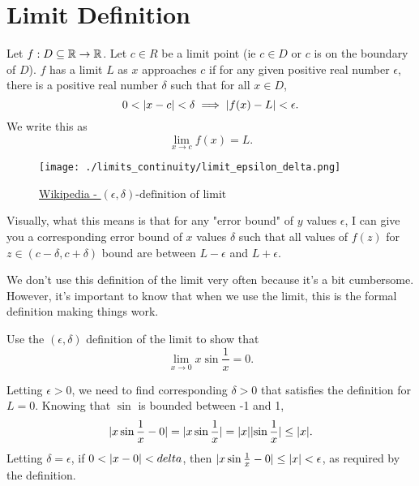 \section{Limit Definition}
\begin{definition}
	Let $f : D \subseteq \mathbb{R} \to \mathbb{R}$.
	Let $c \in R$ be a limit point (ie $c \in D$ or $c$ is on the boundary of $D$).
	$f$ has a limit $L$ as $x$ approaches $c$ if for any given positive real number $\epsilon$, there is a positive real number $\delta$ such that for all $x \in D$,
	\begin{equation}
		0 < \lvert x-c \rvert < \delta \implies \lvert f(x) - L \rvert < \epsilon.
	\end{equation}
	We write this as
	\begin{equation*}
		\lim_{x \to c}{f(x)} = L.	
	\end{equation*}
\end{definition}

\begin{figure}[H]
	\label{unitCircle}
	\centering
	\texttt{[image: ./limits\_continuity/limit\_epsilon\_delta.png]}
	\caption{\hyperref{https://en.wikipedia.org/wiki/(\%CE\%B5,\_\%CE\%B4)-definition\_of\_limit}{}{}{Wikipedia - $(\epsilon, \delta)\text{-definition of limit}$}}
\end{figure}
\noindent
Visually, what this means is that for any "error bound" of $y$ values $\epsilon$, I can give you a corresponding error bound of $x$ values $\delta$ such that all values of $f(z)$ for $z \in (c -\delta, c+ \delta)$ bound are between $L - \epsilon$ and $L + \epsilon$.

\noindent
We don't use this definition of the limit very often because it's a bit cumbersome.
However, it's important to know that when we use the limit, this is the formal definition making things work.

\begin{example}
	Use the $(\epsilon, \delta)$ definition of the limit to show that
	\begin{equation*}
		\lim_{x\to 0}{x\sin{\frac{1}{x}}} = 0.
	\end{equation*}
\end{example}
Letting $\epsilon > 0$, we need to find corresponding $\delta > 0$ that satisfies the definition for $L = 0$.
Knowing that $\sin$ is bounded between -1 and 1,
\begin{equation*}
	\lvert x\sin{\frac{1}{x}} - 0 \rvert = \lvert x\sin{\frac{1}{x}} \rvert = \lvert x \rvert\lvert \sin{\frac{1}{x}} \rvert \leq \lvert x \rvert.
\end{equation*}
\indent
Letting $\delta = \epsilon$, if $0 < \lvert x - 0 \rvert < delta$, then $\lvert x\sin{\frac{1}{x}} - 0 \rvert \leq \lvert x \rvert < \epsilon$, as required by the definition.